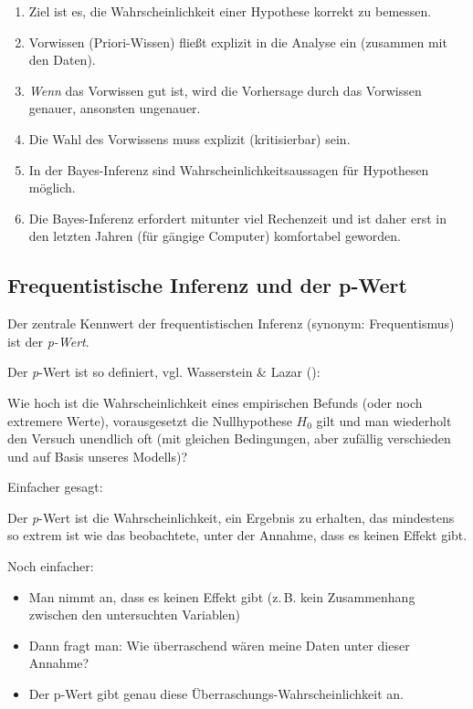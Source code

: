 \documentclass[
  ngerman,
  letterpaper,
  twoside,
  open=any]{scrbook}
\providecommand{\tightlist}{%
  \setlength{\itemsep}{0pt}\setlength{\parskip}{0pt}}\usepackage{longtable,booktabs,array}
\theoremstyle{definition}
\theoremstyle{plain}
\theoremstyle{definition}
\theoremstyle{definition}
\theoremstyle{definition}
\theoremstyle{definition}
\theoremstyle{remark}
\begin{document}
\begin{enumerate}
\def\labelenumi{\arabic{enumi}.}
\tightlist
\item
  Ziel ist es, die Wahrscheinlichkeit einer Hypothese korrekt zu
  bemessen.
\item
  Vorwissen (Priori-Wissen) fließt explizit in die Analyse ein (zusammen
  mit den Daten).
\item
  \emph{Wenn} das Vorwissen gut ist, wird die Vorhersage durch das
  Vorwissen genauer, ansonsten ungenauer.
\item
  Die Wahl des Vorwissens muss explizit (kritisierbar) sein.
\item
  In der Bayes-Inferenz sind Wahrscheinlichkeitsaussagen für Hypothesen
  möglich.
\item
  Die Bayes-Inferenz erfordert mitunter viel Rechenzeit und ist daher
  erst in den letzten Jahren (für gängige Computer) komfortabel
  geworden.
\end{enumerate}

\subsection{Frequentistische Inferenz und der
p-Wert}\label{frequentistische-inferenz-und-der-p-wert}

Der zentrale Kennwert der frequentistischen Inferenz (synonym:
Frequentismus) ist der \emph{p-Wert}.

Der \emph{p}-Wert ist so definiert, vgl. Wasserstein \& Lazar
():

\begin{displayquote}
Wie hoch ist die Wahrscheinlichkeit eines empirischen Befunds (oder noch
extremere Werte), vorausgesetzt die Nullhypothese \(H_0\) gilt und man
wiederholt den Versuch unendlich oft (mit gleichen Bedingungen, aber
zufällig verschieden und auf Basis unseres Modells)?
\end{displayquote}

Einfacher gesagt:

\begin{displayquote}
Der \emph{p}-Wert ist die Wahrscheinlichkeit, ein Ergebnis zu erhalten,
das mindestens so extrem ist wie das beobachtete, unter der Annahme,
dass es keinen Effekt gibt.
\end{displayquote}

Noch einfacher:

\begin{itemize}
\item
  Man nimmt an, dass es keinen Effekt gibt (z.\,B. kein Zusammenhang
  zwischen den untersuchten Variablen)
\item
  Dann fragt man: Wie überraschend wären meine Daten unter dieser
  Annahme?
\item
  Der p-Wert gibt genau diese Überraschungs-Wahrscheinlichkeit an.
\end{itemize}
\end{document}
